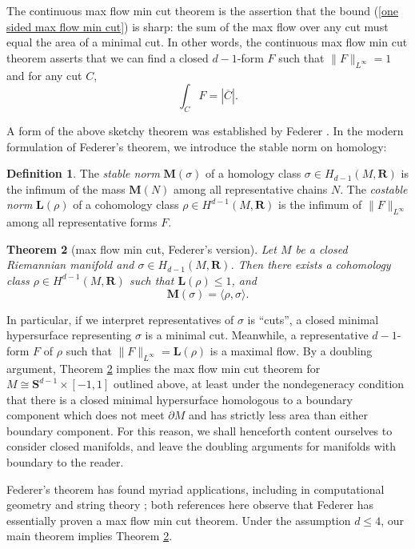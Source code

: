 \documentclass[reqno,11pt]{amsart}
\newcommand{\RR}{\mathbf{R}}
\newcommand{\Sph}{\mathbf S}
\newcommand{\Mass}{\mathbf M}
\newcommand{\Comass}{\mathbf L}
\newcommand{\dfn}[1]{\emph{#1}\index{#1}}
\newtheorem{theorem}{Theorem}[section]
\theoremstyle{definition}
\newtheorem{definition}[theorem]{Definition}
\numberwithin{equation}{section}
\begin{document}
The continuous max flow min cut theorem is the assertion that the bound (\ref{one sided max flow min cut}) is sharp: the sum of the max flow over any cut must equal the area of a minimal cut.
In other words, the continuous max flow min cut theorem asserts that we can find a closed $d - 1$-form $F$ such that $\|F\|_{L^\infty} = 1$ and for any cut $C$,
$$\int_C F = |\overline C|.$$

A form of the above sketchy theorem was established by Federer \cite[\S4.15]{Federer1974}.
In the modern formulation of Federer's theorem, we introduce the stable norm on homology:

\begin{definition}
The \dfn{stable norm} $\Mass(\sigma)$ of a homology class $\sigma \in H_{d - 1}(M, \RR)$ is the infimum of the mass $\Mass(N)$ among all representative chains $N$.
The \dfn{costable norm} $\Comass(\rho)$ of a cohomology class $\rho \in H^{d - 1}(M, \RR)$ is the infimum of $\|F\|_{L^\infty}$ among all representative forms $F$.
\end{definition}

\begin{theorem}[max flow min cut, Federer's version]\label{Federer}
Let $M$ be a closed Riemannian manifold and $\sigma \in H_{d - 1}(M, \RR)$.
Then there exists a cohomology class $\rho \in H^{d - 1}(M, \RR)$ such that $\Comass(\rho) \leq 1$, and 
$$\Mass(\sigma) = \langle \rho, \sigma\rangle.$$
\end{theorem}

In particular, if we interpret representatives of $\sigma$ is ``cuts'', a closed minimal hypersurface representing $\sigma$ is a minimal cut.
Meanwhile, a representative $d - 1$-form $F$ of $\rho$ such that $\|F\|_{L^\infty} = \Comass(\rho)$ is a maximal flow.
By a doubling argument, Theorem \ref{Federer} implies the max flow min cut theorem for $M \cong \Sph^{d - 1} \times [-1, 1]$ outlined above, at least under the nondegeneracy condition that there is a closed minimal hypersurface homologous to a boundary component which does not meet $\partial M$ and has strictly less area than either boundary component.
For this reason, we shall henceforth content ourselves to consider closed manifolds, and leave the doubling arguments for manifolds with boundary to the reader.

Federer's theorem has found myriad applications, including in computational geometry \cite{sullivan1990crystalline} and string theory \cite{Freedman_2016}; both references here observe that Federer has essentially proven a max flow min cut theorem.
Under the assumption $d \leq 4$, our main theorem implies Theorem \ref{Federer}.
\end{document}
